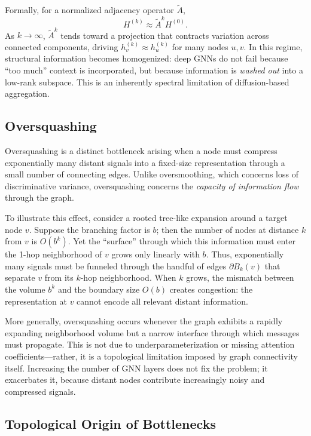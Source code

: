 \documentclass[letterpaper,12pt]{article}
\begin{document}
Formally, for a normalized adjacency operator $\tilde{A}$,
\[
H^{(k)} \approx \tilde{A}^k H^{(0)}.
\]
As $k \to \infty$, $\tilde{A}^k$ tends toward a projection that contracts variation across connected components, driving $h_v^{(k)} \approx h_u^{(k)}$ for many nodes $u, v$. In this regime, structural information becomes homogenized: deep GNNs do not fail because “too much” context is incorporated, but because information is \emph{washed out} into a low-rank subspace. This is an inherently spectral limitation of diffusion-based aggregation.

\subsection{Oversquashing}

Oversquashing is a distinct bottleneck arising when a node must compress exponentially many distant signals into a fixed-size representation through a small number of connecting edges. Unlike oversmoothing, which concerns loss of discriminative variance, oversquashing concerns the \textit{capacity of information flow} through the graph.

To illustrate this effect, consider a rooted tree-like expansion around a target node $v$. Suppose the branching factor is $b$; then the number of nodes at distance $k$ from $v$ is $O(b^k)$. Yet the “surface” through which this information must enter the 1-hop neighborhood of $v$ grows only linearly with $b$. Thus, exponentially many signals must be funneled through the handful of edges $\partial B_k(v)$ that separate $v$ from its $k$-hop neighborhood. When $k$ grows, the mismatch between the volume $b^k$ and the boundary size $O(b)$ creates congestion: the representation at $v$ cannot encode all relevant distant information.

More generally, oversquashing occurs whenever the graph exhibits a rapidly expanding neighborhood volume but a narrow interface through which messages must propagate. This is not due to underparameterization or missing attention coefficients—rather, it is a topological limitation imposed by graph connectivity itself. Increasing the number of GNN layers does not fix the problem; it exacerbates it, because distant nodes contribute increasingly noisy and compressed signals.

\subsection{Topological Origin of Bottlenecks}
\end{document}
